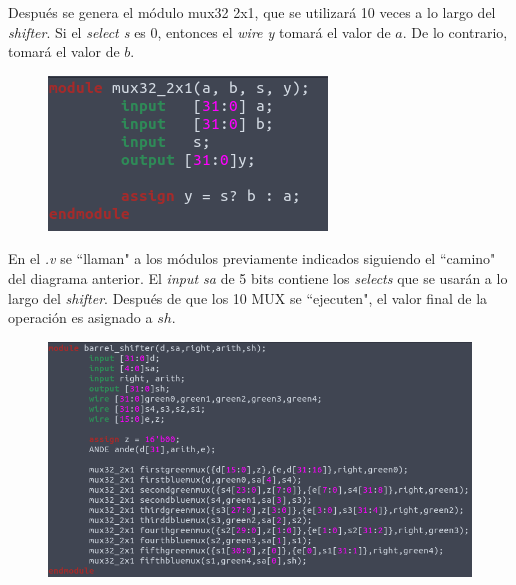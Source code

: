 \documentclass[11pt,a4paper]{article}
\begin{document}
\begin{enumerate}
Después se genera el módulo mux32 2x1, que se utilizará 10 veces a lo largo del \textit{shifter}. Si el \textit{select s} es 0, entonces el \textit{wire y} tomará el valor de $a$. De lo contrario, tomará el valor de $b$.
\begin{figure}[h!]
\centering
\includegraphics[scale=0.5]{barrelshifter_12.png} 
\end{figure}

En el \textit{.v} se ``llaman" a los módulos previamente indicados siguiendo el ``camino" del diagrama anterior. El \textit{input sa} de 5 bits contiene los \textit{selects} que se usarán a lo largo del \textit{shifter}. Después de que los 10 MUX se ``ejecuten", el valor final de la operación es asignado a $sh$.
\begin{figure}[h!]
\centering
\includegraphics[scale=0.4]{barrelshifter_1.png} 
\end{figure}
\pagebreak


\end{enumerate}
\end{document}

